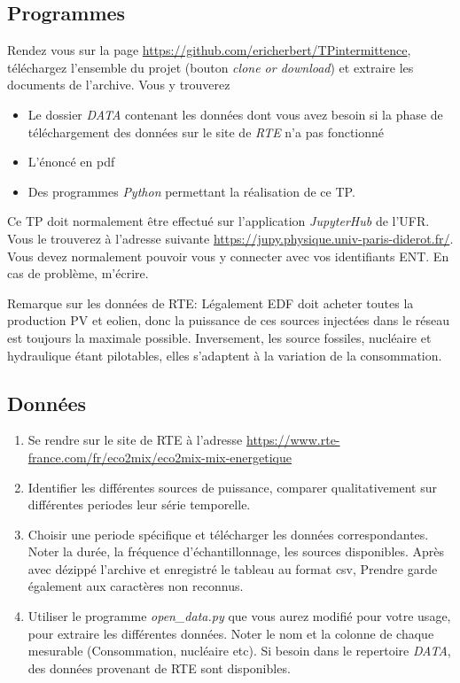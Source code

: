 \documentclass{article}
\newcommand{\tmtextit}[1]{{\itshape{#1}}}
\begin{document}
\subsection{Programmes}

Rendez vous sur la page
\href{}{https://github.com/ericherbert/TPintermittence}, téléchargez
l'ensemble du projet (bouton \tmtextit{clone or download}) et extraire les
documents de l'archive. Vous y trouverez
\begin{itemize}
  \item Le dossier \tmtextit{DATA} contenant les données dont vous avez
  besoin si la phase de téléchargement des données sur le site de
  \tmtextit{RTE} n'a pas fonctionné
  
  \item L'énoncé en pdf
  
  \item Des programmes \tmtextit{Python} permettant la réalisation de ce TP.
\end{itemize}
Ce TP doit normalement être effectué sur l'application \tmtextit{JupyterHub}
de l'UFR. Vous le trouverez à l'adresse suivante
\href{https://jupy.physique.univ-paris-diderot.fr/}{https://jupy.physique.univ-paris-diderot.fr/}.
Vous devez normalement pouvoir vous y connecter avec vos identifiants ENT. En
cas de problème, m'écrire.

Remarque sur les données de RTE: Légalement EDF doit acheter toutes la
production PV et eolien, donc la puissance de ces sources injectées dans le
réseau est toujours la maximale possible. Inversement, les source fossiles,
nucléaire et hydraulique étant pilotables, elles s'adaptent à la variation
de la consommation.

\subsection{Données}

\begin{enumerate}
  \item Se rendre sur le site de RTE à l'adresse
  \href{}{https://www.rte-france.com/fr/eco2mix/eco2mix-mix-energetique}
  
  \item Identifier les différentes sources de puissance, comparer
  qualitativement sur différentes periodes leur série temporelle.
  
  \item Choisir une periode spécifique et télécharger les données
  correspondantes. Noter la durée, la fréquence d'échantillonnage, les
  sources disponibles. Après avec dézippé l'archive et enregistré le
  tableau au format csv, Prendre garde également aux caractères non
  reconnus.
  
  \item Utiliser le programme \tmtextit{open\_data.py} que vous aurez modifié
  pour votre usage, pour extraire les différentes données. Noter le nom et
  la colonne de chaque mesurable (Consommation, nucléaire etc). Si besoin
  dans le repertoire \tmtextit{DATA}, des données provenant de RTE sont
  disponibles.
\end{enumerate}
\end{document}

